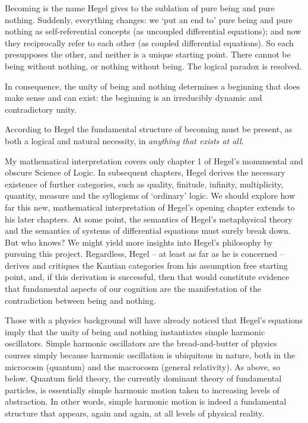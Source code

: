 \documentclass[
]{book}
\begin{document}
Becoming is the name Hegel gives to the sublation of pure being and pure nothing. Suddenly, everything changes: we `put an end to' pure being and pure nothing as self-referential concepts (as uncoupled differential equations); and now they reciprocally refer to each other (as coupled differential equations). So each presupposes the other, and neither is a unique starting point. There cannot be being without nothing, or nothing without being. The logical paradox is resolved.

In consequence, the unity of being and nothing determines a beginning that does make sense and can exist: the beginning is an irreducibly dynamic and contradictory unity.

According to Hegel the fundamental structure of becoming must be present, as both a logical and natural necessity, in \emph{anything that exists at all}.

My mathematical interpretation covers only chapter 1 of Hegel's monumental and obscure Science of Logic. In subsequent chapters, Hegel derives the necessary existence of further categories, such as quality, finitude, infinity, multiplicity, quantity, measure and the syllogisms of `ordinary' logic. We should explore how far this new, mathematical interpretation of Hegel's opening chapter extends to his later chapters. At some point, the semantics of Hegel's metaphysical theory and the semantics of systems of differential equations must surely break down. But who knows? We might yield more insights into Hegel's philosophy by pursuing this project. Regardless, Hegel -- at least as far as he is concerned -- derives and critiques the Kantian categories from his assumption free starting point, and, if this derivation is successful, then that would constitute evidence that fundamental aspects of our cognition are the manifestation of the contradiction between being and nothing.

Those with a physics background will have already noticed that Hegel's equations imply that the unity of being and nothing instantiates simple harmonic oscillators. Simple harmonic oscillators are the bread-and-butter of physics courses simply because harmonic oscillation is ubiquitous in nature, both in the microcosm (quantum) and the macrocosm (general relativity). As above, so below. Quantum field theory, the currently dominant theory of fundamental particles, is essentially simple harmonic motion taken to increasing levels of abstraction. In other words, simple harmonic motion is indeed a fundamental structure that appears, again and again, at all levels of physical reality.
\end{document}
